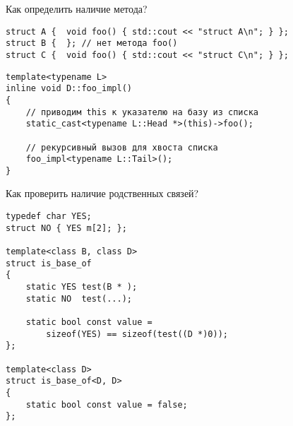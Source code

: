 \documentclass[aspectration=1610,t]{beamer}
\begin{document}

% 
% 

\begin{frame}[fragile]{Как определить наличие метода?}
\begin{lstlisting}
struct A {  void foo() { std::cout << "struct A\n"; } };
struct B {  }; // нет метода foo()
struct C {  void foo() { std::cout << "struct C\n"; } };
\end{lstlisting}

\begin{lstlisting}
template<typename L> 
inline void D::foo_impl() 
{
    // приводим this к указателю на базу из списка
    static_cast<typename L::Head *>(this)->foo();
    
    // рекурсивный вызов для хвоста списка
    foo_impl<typename L::Tail>();
}
\end{lstlisting}
\end{frame}

\begin{frame}[fragile]{Как проверить наличие родственных связей?}
\small
\begin{lstlisting}
typedef char YES;
struct NO { YES m[2]; };

template<class B, class D>
struct is_base_of
{
    static YES test(B * );
    static NO  test(...);
    
    static bool const value = 
        sizeof(YES) == sizeof(test((D *)0));
};

template<class D> 
struct is_base_of<D, D> 
{
    static bool const value = false;
};
\end{lstlisting}
\end{frame}
\end{document}
